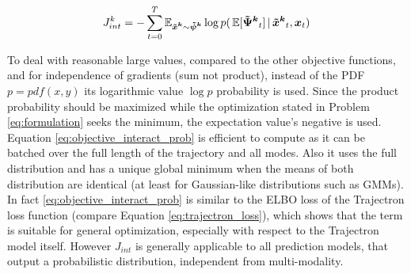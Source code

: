 \begin{equation}
J_{int}^k = - \sum_{t=0}^T \mathbb{E}_{\xped[k] \sim \dist[k]} \log p(\, \mathbb{E}[\distwo[k]_t] \, | \, \xped[k]_t, \x_t)
\label{eq:objective_interact_prob}
\end{equation}

To deal with reasonable large values, compared to the other objective functions, and for independence of gradients (sum not product), instead of the \ac{PDF} $p = pdf(x, y)$ its logarithmic value $\log p$ probability is used. Since the product probability should be maximized while the optimization stated in Problem \ref{eq:formulation} seeks the minimum, the expectation value's negative is used.
\newline
Equation \ref{eq:objective_interact_prob} is efficient to compute as it can be batched over the full length of the trajectory and all modes. Also it uses the full distribution and has a unique global minimum when the means of both distribution are identical (at least for Gaussian-like distributions such as \ac{GMM}s). In fact \ref{eq:objective_interact_prob} is similar to the \ac{ELBO} loss of the Trajectron loss function (compare Equation \ref{eq:trajectron_loss}), which shows that the term is suitable for general optimization, especially with respect to the Trajectron model itself. However $J_{int}$ is generally applicable to all prediction models, that output a probabilistic distribution, independent from multi-modality.
